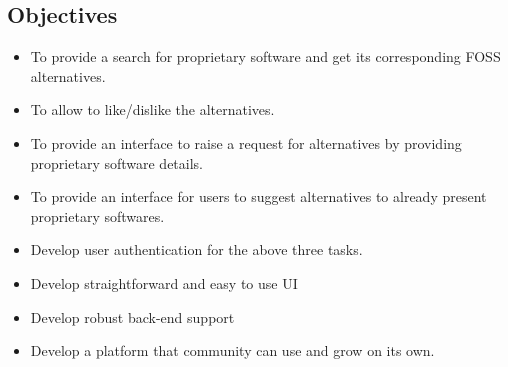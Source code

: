 \subsection{Objectives}
\begin{itemize}
    \item To provide a search for proprietary software and get its corresponding FOSS alternatives.
    \item To allow to like/dislike the alternatives.
    \item To provide an interface to raise a request for alternatives by providing proprietary software details.
    \item To provide an interface for users to suggest alternatives to already present proprietary softwares.
    \item Develop user authentication for the above three tasks.
    \item Develop straightforward and easy to use UI
    \item Develop robust back-end support
    \item Develop a platform that community can use and grow on its own.
\end{itemize}